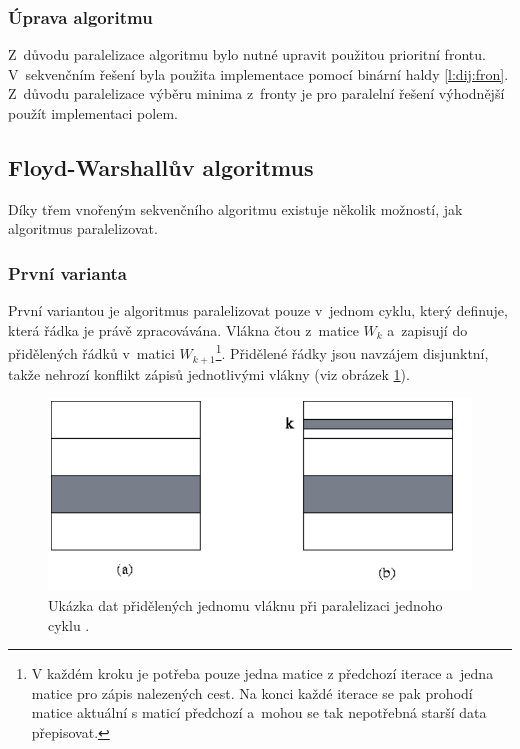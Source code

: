\subsubsection{Úprava algoritmu}
Z~důvodu paralelizace algoritmu bylo nutné upravit použitou prioritní frontu. V~sekvenčním řešení byla použita implementace pomocí binární haldy \ref{l:dij:fron}. Z~důvodu paralelizace výběru minima z~fronty je pro paralelní řešení výhodnější použít implementaci polem.


\subsection{Floyd-Warshallův algoritmus}
Díky třem vnořeným sekvenčního algoritmu existuje několik možností, jak algoritmus paralelizovat.

\subsubsection{První varianta}
První variantou je algoritmus paralelizovat pouze v~jednom cyklu, který definuje, která řádka je právě zpracovávána. 
Vlákna čtou z~matice $W_k$ a~zapisují do přidělených řádků v~matici $W_{k+1}$\footnote{V každém kroku je
potřeba pouze jedna matice z předchozí iterace a~jedna matice pro zápis nalezených cest. Na konci každé iterace 
se pak prohodí matice aktuální s maticí předchozí a~mohou se tak nepotřebná starší data přepisovat.}. Přidělené řádky 
jsou navzájem disjunktní, takže nehrozí konflikt zápisů jednotlivými vlákny (viz obrázek \ref{f:fw:omp}).


\begin{figure}
    \centering
    \includegraphics[width=\textwidth]{floyd-openmp}
    \caption{Ukázka dat přidělených jednomu vláknu při paralelizaci jednoho cyklu \cite{w:fw:omp}.}
    \label{f:fw:omp}
\end{figure}


